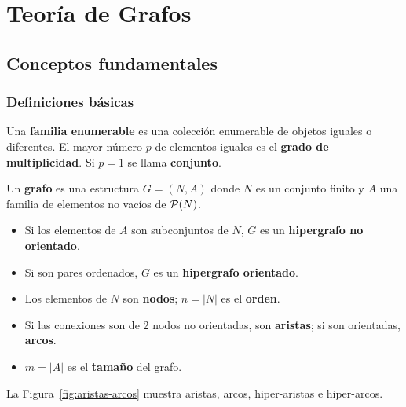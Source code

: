 \chapter{Teoría de Grafos}

\section{Conceptos fundamentales}

\subsection{Definiciones básicas}

\begin{definicion}
Una \textbf{familia enumerable} es una colección enumerable de objetos iguales o diferentes. El mayor número $p$ de elementos iguales es el \textbf{grado de multiplicidad}. Si $p = 1$ se llama \textbf{conjunto}.
\end{definicion}

\begin{definicion}
Un \textbf{grafo} es una estructura $G = (N, A)$ donde $N$ es un conjunto finito y $A$ una familia de elementos no vacíos de $\mathcal{P}(N)$.
\begin{itemize}
  \item Si los elementos de $A$ son subconjuntos de $N$, $G$ es un \textbf{hipergrafo no orientado}.
  \item Si son pares ordenados, $G$ es un \textbf{hipergrafo orientado}.
  \item Los elementos de $N$ son \textbf{nodos}; $n = |N|$ es el \textbf{orden}.
  \item Si las conexiones son de 2 nodos no orientadas, son \textbf{aristas}; si son orientadas, \textbf{arcos}.
  \item $m = |A|$ es el \textbf{tamaño} del grafo.
\end{itemize}
\end{definicion}

\begin{ejemplo}
La Figura~\ref{fig:aristas-arcos} muestra aristas, arcos, hiper-aristas e hiper-arcos.
\end{ejemplo}

